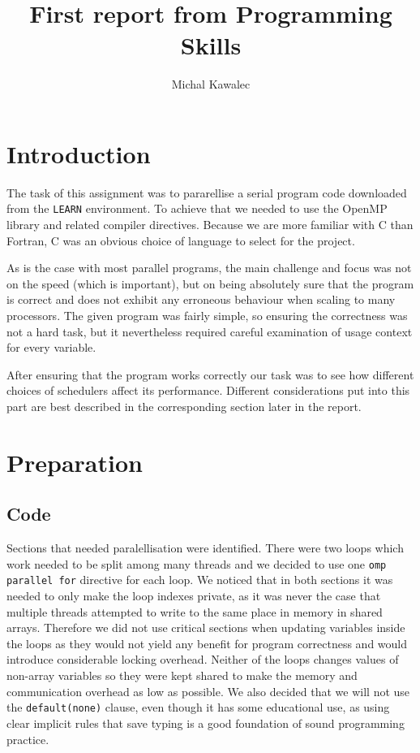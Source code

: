 \documentclass[11pt,a4paper]{article}
\begin{document}
\title{First report from Programming Skills}
\author{Michal Kawalec}
\maketitle

\section{Introduction}
The task of this assignment was to pararellise a serial program code downloaded from the \texttt{LEARN} environment. To achieve that we needed to use the OpenMP library and related compiler directives. Because we are more familiar with C than Fortran, C was an obvious choice of language to select for the project. 

As is the case with most parallel programs, the main challenge and focus was not on the speed (which is important), but on being absolutely sure that the program is correct and does not exhibit any erroneous behaviour when scaling to many processors. The given program was fairly simple, so ensuring the correctness was not a hard task, but it nevertheless required careful examination of usage context for every variable.

After ensuring that the program works correctly our task was to see how different choices of schedulers affect its performance. Different considerations put into this part are best described in the corresponding section later in the report.

\section{Preparation}
\subsection{Code}
Sections that needed paralellisation were identified. There were two loops which work needed to be split among many threads and we decided to use one \texttt{omp parallel for} directive for each loop. We noticed that in both sections it was needed to only make the loop indexes private, as it was never the case that multiple threads attempted to write to the same place in memory in shared arrays. Therefore we did not use critical sections when updating variables inside the loops as they would not yield any benefit for program correctness and would introduce considerable locking overhead. Neither of the loops changes values of non-array variables so they were kept shared to make the memory and communication overhead as low as possible. We also decided that we will not use the \texttt{default(none)} clause, even though it has some educational use, as using clear implicit rules that save typing is a good foundation of sound programming practice.
\end{document}
